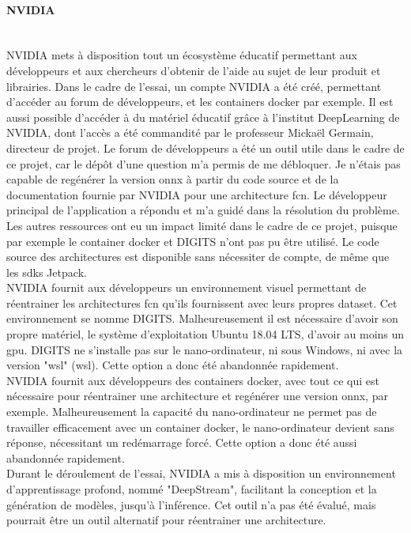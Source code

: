 \paragraph{NVIDIA}
\vspace{0.5\baselineskip}
\\
\noindent NVIDIA mets à disposition tout un écosystème éducatif permettant aux développeurs et aux chercheurs d'obtenir de l'aide au sujet de leur produit et librairies. Dans le cadre de l'essai, un compte NVIDIA a été créé, permettant d'accéder au forum de développeurs, et les containers docker par exemple. Il est aussi possible d'accéder à du matériel éducatif grâce à l'institut DeepLearning de NVIDIA, dont l'accès a été commandité par le professeur Mickaël Germain, directeur de projet. Le forum de développeurs a été un outil utile dans le cadre de ce projet, car le dépôt d'une question m'a permis de me débloquer. Je n'étais pas capable de regénérer la version \acrshort{onnx} à partir du code source et de la documentation fournie par NVIDIA pour une architecture \acrshort{fcn}. Le développeur principal de l'application a répondu et m'a guidé dans la résolution du problème. Les autres ressources ont eu un impact limité dans le cadre de ce projet, puisque par exemple le container docker et DIGITS n'ont pas pu être utilisé. Le code source des architectures est disponible sans nécessiter de compte, de même que les \acrshort{sdk}s Jetpack.
\vspace{0.5\baselineskip}
\\
\noindent NVIDIA fournit aux développeurs un environnement visuel permettant de réentrainer les architectures \acrshort{fcn} qu'ils fournissent avec leurs propres dataset. Cet environnement se nomme DIGITS. Malheureusement il est nécessaire d'avoir son propre matériel, le système d'exploitation Ubuntu 18.04 LTS, d'avoir au moins un \acrshort{gpu}. DIGITS ne s'installe pas sur le nano-ordinateur, ni sous Windows, ni avec la version "\acrshort{wsl}" (\acrlong{wsl}). Cette option a donc été abandonnée rapidement. 
\vspace{0.5\baselineskip}
\\
\noindent NVIDIA fournit aux développeurs des containers docker, avec tout ce qui est nécessaire pour réentrainer une architecture et regénérer une version \acrshort{onnx}, par exemple. Malheureusement la capacité du nano-ordinateur ne permet pas de travailler efficacement avec un container docker, le nano-ordinateur devient sans réponse, nécessitant un redémarrage forcé. Cette option a donc été aussi abandonnée rapidement. 
\vspace{0.5\baselineskip}
\\
\noindent Durant le déroulement de l'essai, NVIDIA a mis à disposition un environnement d'apprentissage profond, nommé "DeepStream", facilitant la conception et la génération de modèles, jusqu'à l'inférence. Cet outil n'a pas été évalué, mais pourrait être un outil alternatif pour réentrainer une architecture.